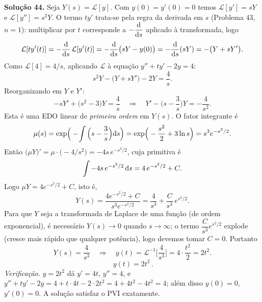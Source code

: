 \bigskip\noindent\textbf{Solução 44.}\quad
Seja $Y(s)=\mathcal{L}[y]$. Com $y(0)=y'(0)=0$ temos $\mathcal{L}[y']=sY$ e $\mathcal{L}[y'']=s^2Y$. O termo $ty'$ trata-se pela regra da derivada em $s$ (Problema 43, $n=1$): multiplicar por $t$ corresponde a $-\dfrac{\mathrm{d}}{\mathrm{d} s}$ aplicado à transformada, logo
\[
\mathcal{L}[t y'(t)]=-\frac{\mathrm{d}}{\mathrm{d} s}\,\mathcal{L}[y'(t)]=-\frac{\mathrm{d}}{\mathrm{d} s}\big(sY-y(0)\big)=-\frac{\mathrm{d}}{\mathrm{d} s}(sY)=-\big(Y+sY'\big).
\]
Como $\mathcal{L}[4]=4/s$, aplicando $\mathcal{L}$ à equação $y''+ty'-2y=4$:
\[
s^2Y-\big(Y+sY'\big)-2Y=\frac4s.
\]
Reorganizando em $Y$ e $Y'$:
\[
-sY'+\big(s^2-3\big)Y=\frac4s
\quad\Longrightarrow\quad
Y'-\Big(s-\frac3s\Big)Y=-\frac{4}{s^2}.
\]
Esta é uma EDO linear de \emph{primeira ordem} em $Y(s)$. O fator integrante é
\[
\mu(s)=\exp\!\Big(-\!\int\Big(s-\frac3s\Big)\mathrm{d} s\Big)=\exp\!\Big(-\frac{s^2}{2}+3\ln s\Big)=s^3 e^{-s^2/2}.
\]
Então $\big(\mu Y\big)'=\mu\cdot\big(-4/s^2\big)=-4 s\,e^{-s^2/2}$, cuja primitiva é
\[
\int -4 s\,e^{-s^2/2}\,\mathrm{d} s=4\,e^{-s^2/2}+C.
\]
Logo $\mu Y=4 e^{-s^2/2}+C$, isto é,
\[
Y(s)=\frac{4 e^{-s^2/2}+C}{s^3 e^{-s^2/2}}=\frac{4}{s^3}+\frac{C}{s^3}\,e^{s^2/2}.
\]
Para que $Y$ seja a transformada de Laplace de uma função (de ordem exponencial), é necessário $Y(s)\to0$ quando $s\to\infty$; o termo $\dfrac{C}{s^3}e^{s^2/2}$ explode (cresce mais rápido que qualquer potência), logo devemos tomar $C=0$. Portanto
\[
Y(s)=\frac{4}{s^3}\quad\Longrightarrow\quad y(t)=\mathcal{L}^{-1}\Big[\frac{4}{s^3}\Big]=4\cdot\frac{t^2}{2}=2t^2.
\]
\[
\boxed{\,y(t)=2t^2\,}.
\]
\emph{Verificação.} $y=2t^2$ dá $y'=4t$, $y''=4$, e $y''+ty'-2y=4+t\cdot4t-2\cdot2t^2=4+4t^2-4t^2=4$; além disso $y(0)=0$, $y'(0)=0$. A solução satisfaz o PVI exatamente.


